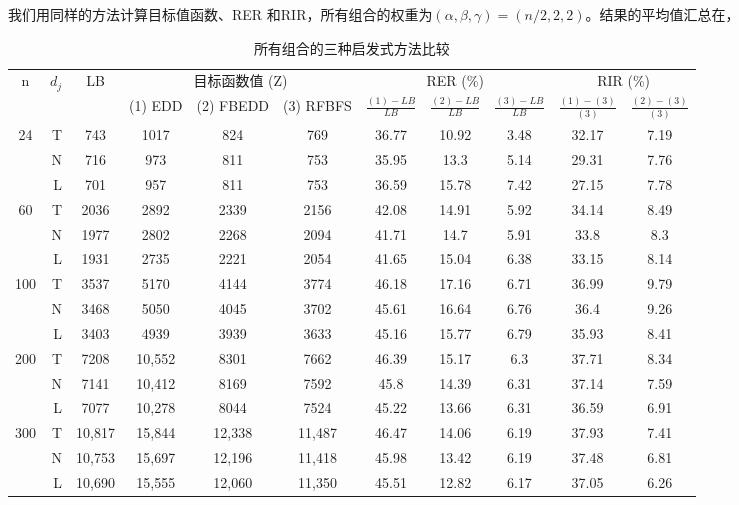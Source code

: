 我们用同样的方法计算目标值函数、RER 和RIR，所有组合的权重为$(\alpha,\beta,\gamma) = (n/2,2,2)$。结果的平均值汇总在，
\begin{table}[h]
  \centering\xiaowu
  \caption{所有组合的三种启发式方法比较\label{tab:allcompare}}
    \begin{tabular}{crccccccccc}
    \toprule
    \multirow{2}[4]{*}{n} & \multicolumn{1}{c}{\multirow{2}[4]{*}{$d_j$}} & \multirow{2}[4]{*}{LB} & \multicolumn{3}{c}{目标函数值 (Z)} & \multicolumn{3}{c}{RER (\%)} & \multicolumn{2}{c}{RIR (\%)} \\
    \cline{4-11}
          & \multicolumn{1}{c}{} &       & (1) EDD & (2) FBEDD & (3) RFBFS &$\frac{(1) - LB}{LB}$ & $\frac{(2) - LB}{LB}$ & $\frac{(3) - LB}{LB}$ &$\frac{(1) - (3)}{(3)}$ & $\frac{(2) - (3)}{(3)}$\\
      \midrule    
    \multirow{3}[1]{*}{24} & T     & 743   & 1017  & 824   & 769   & 36.77 & 10.92 & 3.48  & 32.17 & 7.19 \\
          & N     & 716   & 973   & 811   & 753   & 35.95 & 13.3  & 5.14  & 29.31 & 7.76 \\
          & L     & 701   & 957   & 811   & 753   & 36.59 & 15.78 & 7.42  & 27.15 & 7.78 \\[3pt]
    \multirow{3}[0]{*}{60} & T     & 2036  & 2892  & 2339  & 2156  & 42.08 & 14.91 & 5.92  & 34.14 & 8.49 \\
          & N     & 1977  & 2802  & 2268  & 2094  & 41.71 & 14.7  & 5.91  & 33.8  & 8.3 \\
          & L     & 1931  & 2735  & 2221  & 2054  & 41.65 & 15.04 & 6.38  & 33.15 & 8.14 \\[3pt]
    \multirow{3}[0]{*}{100} & T     & 3537  & 5170  & 4144  & 3774  & 46.18 & 17.16 & 6.71  & 36.99 & 9.79 \\
          & N     & 3468  & 5050  & 4045  & 3702  & 45.61 & 16.64 & 6.76  & 36.4  & 9.26 \\
          & L     & 3403  & 4939  & 3939  & 3633  & 45.16 & 15.77 & 6.79  & 35.93 & 8.41 \\[3pt]
    \multirow{3}[0]{*}{200} & T     & 7208  & 10,552 & 8301  & 7662  & 46.39 & 15.17 & 6.3   & 37.71 & 8.34 \\
          & N     & 7141  & 10,412 & 8169  & 7592  & 45.8  & 14.39 & 6.31  & 37.14 & 7.59 \\
          & L     & 7077  & 10,278 & 8044  & 7524  & 45.22 & 13.66 & 6.31  & 36.59 & 6.91 \\[3pt]
    \multirow{3}[1]{*}{300} & T     & 10,817 & 15,844 & 12,338 & 11,487 & 46.47 & 14.06 & 6.19  & 37.93 & 7.41 \\
          & N     & 10,753 & 15,697 & 12,196 & 11,418 & 45.98 & 13.42 & 6.19  & 37.48 & 6.81 \\
          & L     & 10,690 & 15,555 & 12,060 & 11,350 & 45.51 & 12.82 & 6.17  & 37.05 & 6.26 \\
    \bottomrule
    \end{tabular}
\end{table}
